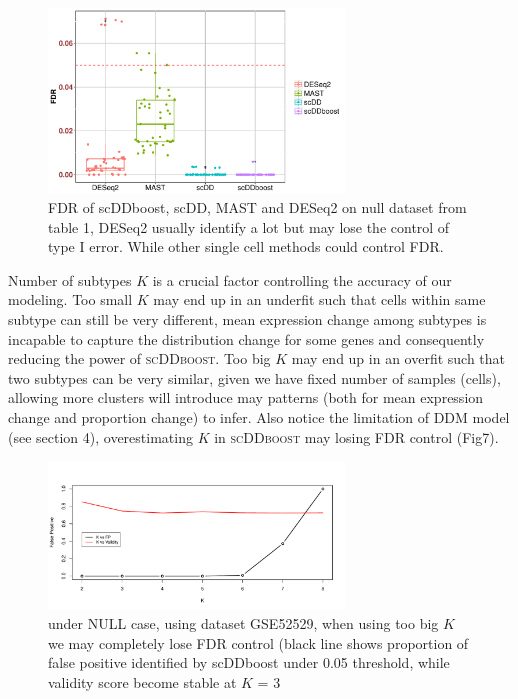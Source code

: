 \documentclass[aoas,preprint]{imsart}
\begin{document}
\begin{figure}[H]
\includegraphics[width = 0.7\textwidth]{Figs/fdr.pdf}
 \caption{FDR of scDDboost, scDD, MAST and DESeq2 on null dataset from table 1, DESeq2 usually identify a lot but may lose the control of type I error. While other single cell methods could control FDR. }
  \label{fig:7}
\end{figure}

Number of subtypes $K$ is a crucial factor controlling the accuracy of our modeling. 
Too small $K$ may end up in an underfit such that cells within same subtype can still be very different,
mean expression change among subtypes is incapable to capture the distribution change for some genes and consequently reducing the power of \textsc{scDDboost}.
Too big $K$ may end up in an overfit such that two subtypes can be very similar, given we have fixed number of samples (cells), allowing more clusters will introduce may patterns (both for mean expression change and proportion change) to infer. Also notice the limitation of DDM model (see section 4), overestimating $K$ in \textsc{scDDboost} may losing FDR control (Fig7).

\begin{figure}[H]
\includegraphics[width = 0.7\textwidth]{Figs/NULL.pdf}
 \caption{under NULL case, using dataset GSE52529, when using too big $K$ we may completely lose FDR control (black line shows proportion of false positive identified by scDDboost under 0.05 threshold, while validity score become stable at $K$ = 3 }
  \label{fig:7}
\end{figure}
\end{document}
